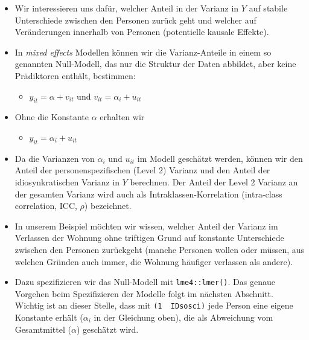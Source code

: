 \documentclass[
]{book}
\newenvironment{Shaded}{\begin{snugshade}}{\end{snugshade}}
\newcommand{\CommentTok}[1]{\textcolor[rgb]{0.56,0.35,0.01}{\textit{#1}}}
\newcommand{\DataTypeTok}[1]{\textcolor[rgb]{0.13,0.29,0.53}{#1}}
\newcommand{\DecValTok}[1]{\textcolor[rgb]{0.00,0.00,0.81}{#1}}
\newcommand{\KeywordTok}[1]{\textcolor[rgb]{0.13,0.29,0.53}{\textbf{#1}}}
\newcommand{\NormalTok}[1]{#1}
\newcommand{\OperatorTok}[1]{\textcolor[rgb]{0.81,0.36,0.00}{\textbf{#1}}}
\newcommand{\StringTok}[1]{\textcolor[rgb]{0.31,0.60,0.02}{#1}}
\providecommand{\tightlist}{%
  \setlength{\itemsep}{0pt}\setlength{\parskip}{0pt}}
\begin{document}
\begin{itemize}
\item
  Wir interessieren uns dafür, welcher Anteil in der Varianz in \(Y\) auf stabile Unterschiede zwischen den Personen zurück geht und welcher auf Veränderungen innerhalb von Personen (potentielle kausale Effekte).
\item
  In \emph{mixed effects} Modellen können wir die Varianz-Anteile in einem so genannten Null-Modell, das nur die Struktur der Daten abbildet, aber keine Prädiktoren enthält, bestimmen:

  \begin{itemize}
  \tightlist
  \item
    \(y_{it}= \alpha + v_{it}\) und \(v_{it} = \alpha_{i}+ u_{it}\)
  \end{itemize}
\item
  Ohne die Konstante \(\alpha\) erhalten wir

  \begin{itemize}
  \tightlist
  \item
    \(y_{it} = \alpha_{i}+ u_{it}\)
  \end{itemize}
\item
  Da die Varianzen von \(\alpha_i\) und \(u_{it}\) im Modell geschätzt werden, können wir den Anteil der personenspezifischen (Level 2) Varianz und den Anteil der idiosynkratischen Varianz in \(Y\) berechnen. Der Anteil der Level 2 Varianz an der gesamten Varianz wird auch als Intraklassen-Korrelation (intra-class correlation, ICC, \(\rho\)) bezeichnet.
\item
  In unserem Beispiel möchten wir wissen, welcher Anteil der Varianz im Verlassen der Wohnung ohne triftigen Grund auf konstante Unterschiede zwischen den Personen zurückgeht (manche Personen wollen oder müssen, aus welchen Gründen auch immer, die Wohnung häufiger verlassen als andere).
\item
  Dazu spezifizieren wir das Null-Modell mit \texttt{lme4::lmer()}. Das genaue Vorgehen beim Spezifizieren der Modelle folgt im nächsten Abschnitt. Wichtig ist an dieser Stelle, dass mit \texttt{(1\ \textbar{}\ IDsosci)} jede Person eine eigene Konstante erhält (\(\alpha_i\) in der Gleichung oben), die als Abweichung vom Gesamtmittel (\(\alpha\)) geschätzt wird.
\end{itemize}

\begin{Shaded}
\end{Shaded}
\end{document}
